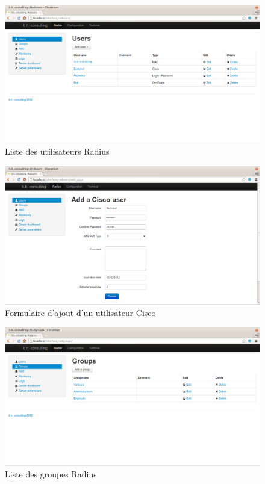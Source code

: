 	\begin{figure}[!h]
	\begin{center}
		\includegraphics[width=\textwidth]{img/capture2.png}
	\end{center}
	\caption{Liste des utilisateurs Radius}
	\end{figure}

	\begin{figure}[!h]
	\begin{center}
		\includegraphics[width=\textwidth]{img/capture1.png}
	\end{center}
	\caption{Formulaire d'ajout d'un utilisateur Cisco}
	\end{figure}

	\begin{figure}[!h]
	\begin{center}
		\includegraphics[width=\textwidth]{img/capture3.png}
	\end{center}
	\caption{Liste des groupes Radius}
	\end{figure}


